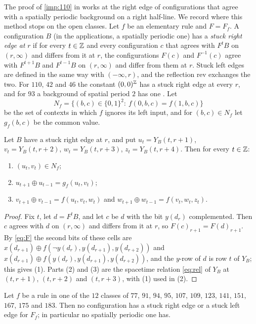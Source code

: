 The proof of \eqref{imp:110} in \cite{PaperA} works at the right edge of configurations that agree with a spatially periodic background on a right half-line. We record where this method stops on the open classes. Let $f$ be an elementary rule and $F=F_f$. A configuration $B$ (in the applications, a spatially periodic one) has a \emph{stuck right edge at $r$} if for every $t\in\mathbb{Z}$ and every configuration $c$ that agrees with $F^tB$ on $(r,\infty)$ and differs from it at $r$, the configurations $F(c)$ and $F^{-1}(c)$ agree with $F^{t+1}B$ and $F^{t-1}B$ on $(r,\infty)$ and differ from them at $r$. Stuck left edges are defined in the same way with $(-\infty,r)$, and the reflection $\mathrm{rev}$ exchanges the two. For $110$, $42$ and $46$ the constant $(0,0)^{\mathbb{Z}}$ has a stuck right edge at every $r$, and for $93$ a background of spatial period $2$ has one \cite{PaperA}. Let
\[
N_f=\{(b,c)\in\{0,1\}^2:\ f(0,b,c)=f(1,b,c)\}
\]
be the set of contexts in which $f$ ignores its left input, and for $(b,c)\in N_f$ let $g_f(b,c)$ be the common value.

\begin{lemma}\label{cl:lem:stuckcols}
Let $B$ have a stuck right edge at $r$, and put $u_t=Y_B(t,r+1)$, $v_t=Y_B(t,r+2)$, $w_t=Y_B(t,r+3)$, $z_t=Y_B(t,r+4)$. Then for every $t\in\mathbb{Z}$:
\begin{enumerate}
\item $(u_t,v_t)\in N_f$;
\item $u_{t+1}\oplus u_{t-1}=g_f(u_t,v_t)$;
\item $v_{t+1}\oplus v_{t-1}=f(u_t,v_t,w_t)$ and $w_{t+1}\oplus w_{t-1}=f(v_t,w_t,z_t)$.
\end{enumerate}
\end{lemma}

\begin{proof}
Fix $t$, let $d=F^tB$, and let $c$ be $d$ with the bit $y(d_r)$ complemented. Then $c$ agrees with $d$ on $(r,\infty)$ and differs from it at $r$, so $F(c)_{r+1}=F(d)_{r+1}$. By \eqref{eq:F} the second bits of these cells are $x(d_{r+1})\oplus f(\neg y(d_r),y(d_{r+1}),y(d_{r+2}))$ and $x(d_{r+1})\oplus f(y(d_r),y(d_{r+1}),y(d_{r+2}))$, and the $y$-row of $d$ is row $t$ of $Y_B$; this gives (1). Parts (2) and (3) are the spacetime relation \eqref{eq:rel} of $Y_B$ at $(t,r+1)$, $(t,r+2)$ and $(t,r+3)$, with (1) used in (2).
\end{proof}

\begin{proposition}\label{cl:prop:nostuck}
Let $f$ be a rule in one of the $12$ classes of $77$, $91$, $94$, $95$, $107$, $109$, $123$, $141$, $151$, $167$, $175$ and $183$. Then no configuration has a stuck right edge or a stuck left edge for $F_f$; in particular no spatially periodic one has.
\end{proposition}

